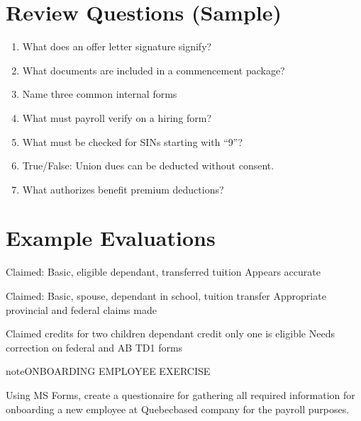 \documentclass[letterpaper,10pt,english]{sphinxmanual}
\begin{document}
\section{Review Questions (Sample)}
\label{\detokenize{onboarding_employee:review-questions-sample}}\begin{enumerate}
%
\item {} 
\sphinxAtStartPar
What does an offer letter signature signify?

\item {} 
\sphinxAtStartPar
What documents are included in a commencement package?

\item {} 
\sphinxAtStartPar
Name three common internal forms

\item {} 
\sphinxAtStartPar
What must payroll verify on a hiring form?

\item {} 
\sphinxAtStartPar
What must be checked for SINs starting with “9”?

\item {} 
\sphinxAtStartPar
True/False: Union dues can be deducted without consent.

\item {} 
\sphinxAtStartPar
What authorizes benefit premium deductions?

\end{enumerate}


\section{Example Evaluations}
\label{\detokenize{onboarding_employee:example-evaluations}}
\sphinxAtStartPar
{}
\sphinxhyphen{} Claimed: Basic, eligible dependant, transferred tuition
\sphinxhyphen{} Appears accurate

\sphinxAtStartPar
{}
\sphinxhyphen{} Claimed: Basic, spouse, dependant in school, tuition transfer
\sphinxhyphen{} Appropriate provincial and federal claims made

\sphinxAtStartPar
{}
\sphinxhyphen{} Claimed credits for two children
\sphinxhyphen{}  dependant credit \textendash{} only one is eligible
\sphinxhyphen{} Needs correction on federal and AB TD1 forms

\begin{sphinxadmonition}{note}{ONBOARDING EMPLOYEE EXERCISE}

\sphinxAtStartPar
Using MS Forms, create a questionaire for gathering all required information for onboarding a new employee at Quebec\sphinxhyphen{}based company for the payroll purposes.
\end{sphinxadmonition}
\end{document}
